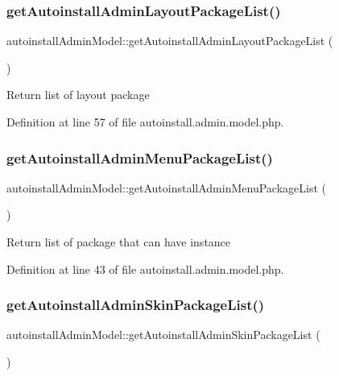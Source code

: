 \subsubsection{\texorpdfstring{get\+Autoinstall\+Admin\+Layout\+Package\+List()}{getAutoinstallAdminLayoutPackageList()}}
{\footnotesize\ttfamily autoinstall\+Admin\+Model\+::get\+Autoinstall\+Admin\+Layout\+Package\+List (\begin{DoxyParamCaption}{ }\end{DoxyParamCaption})}

Return list of layout package 

Definition at line 57 of file autoinstall.\+admin.\+model.\+php.

\hypertarget{classautoinstallAdminModel_a9cb4da298ab863dec8b7664cac2e42a5}{}\label{classautoinstallAdminModel_a9cb4da298ab863dec8b7664cac2e42a5} 
\subsubsection{\texorpdfstring{get\+Autoinstall\+Admin\+Menu\+Package\+List()}{getAutoinstallAdminMenuPackageList()}}
{\footnotesize\ttfamily autoinstall\+Admin\+Model\+::get\+Autoinstall\+Admin\+Menu\+Package\+List (\begin{DoxyParamCaption}{ }\end{DoxyParamCaption})}

Return list of package that can have instance 

Definition at line 43 of file autoinstall.\+admin.\+model.\+php.

\hypertarget{classautoinstallAdminModel_aee0002dcda8a05d57f8f7e5304be087c}{}\label{classautoinstallAdminModel_aee0002dcda8a05d57f8f7e5304be087c} 
\subsubsection{\texorpdfstring{get\+Autoinstall\+Admin\+Skin\+Package\+List()}{getAutoinstallAdminSkinPackageList()}}
{\footnotesize\ttfamily autoinstall\+Admin\+Model\+::get\+Autoinstall\+Admin\+Skin\+Package\+List (\begin{DoxyParamCaption}{ }\end{DoxyParamCaption})}

